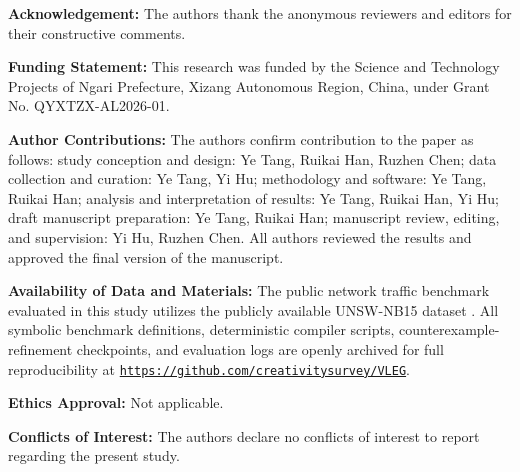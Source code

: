 \documentclass[11pt,letterpaper,onecolumn]{article}
\begin{document}
\vspace{0.7em}
{\fontsize{10}{12.5}\selectfont
\noindent\textbf{Acknowledgement:} The authors thank the anonymous reviewers and editors for their constructive comments.\par\vspace{0.25em}
\noindent\textbf{Funding Statement:} This research was funded by the Science and Technology Projects of Ngari Prefecture, Xizang Autonomous Region, China, under Grant No. QYXTZX-AL2026-01.\par\vspace{0.25em}
\noindent\textbf{Author Contributions:} The authors confirm contribution to the paper as follows: study conception and design: Ye Tang, Ruikai Han, Ruzhen Chen; data collection and curation: Ye Tang, Yi Hu; methodology and software: Ye Tang, Ruikai Han; analysis and interpretation of results: Ye Tang, Ruikai Han, Yi Hu; draft manuscript preparation: Ye Tang, Ruikai Han; manuscript review, editing, and supervision: Yi Hu, Ruzhen Chen. All authors reviewed the results and approved the final version of the manuscript.\par\vspace{0.25em}
\noindent\textbf{Availability of Data and Materials:} The public network traffic benchmark evaluated in this study utilizes the publicly available UNSW-NB15 dataset \cite{moustafa2015unsw}. All symbolic benchmark definitions, deterministic compiler scripts, counterexample-refinement checkpoints, and evaluation logs are openly archived for full reproducibility at \linebreak[3]\href{https://github.com/creativitysurvey/VLEG}{\texttt{https://github.com/creativitysurvey/VLEG}}.\par\vspace{0.25em}
\noindent\textbf{Ethics Approval:} Not applicable.\par\vspace{0.25em}
\noindent\textbf{Conflicts of Interest:} The authors declare no conflicts of interest to report regarding the present study.\par
}
\end{document}

